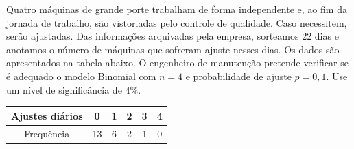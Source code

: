 %
%


\begin{exercicioBanco}[\valorquestao]
    Quatro máquinas de grande porte trabalham de forma independente e, ao fim da jornada de trabalho, são vistoriadas pelo controle de qualidade. Caso necessitem, serão ajustadas. Das informações arquivadas pela empresa, sorteamos 22 dias e anotamos o número de máquinas que sofreram ajuste nesses dias. Os dados são apresentados na tabela abaixo. O engenheiro de manutenção pretende verificar se é adequado o modelo Binomial com \(n=4\) e probabilidade de ajuste \(p=0{,}1\). Use um nível de significância de \(4\%\).

    \begin{center}
    \begin{tabular}{|c|ccccc|}
        \hline
        Ajustes diários & 0 & 1 & 2 & 3 & 4 \\
        \hline
        Frequência      & 13 & 6 & 2 & 1 & 0 \\
        \hline
    \end{tabular}
    \end{center}
\end{exercicioBanco}

